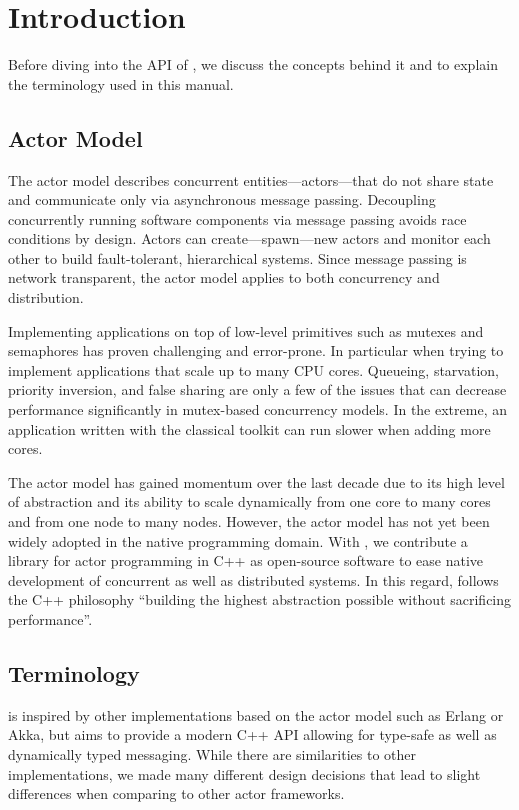 \section{Introduction}

Before diving into the API of \lib, we discuss the concepts behind it and to explain the terminology used in this manual.

\subsection{Actor Model}

The actor model describes concurrent entities---actors---that do not share state and communicate only via asynchronous message passing.
Decoupling concurrently running software components via message passing avoids race conditions by design.
Actors can create---spawn---new actors and monitor each other to build fault-tolerant, hierarchical systems.
Since message passing is network transparent, the actor model applies to both concurrency and distribution.

Implementing applications on top of low-level primitives such as mutexes and semaphores has proven challenging and error-prone.
In particular when trying to implement applications that scale up to many CPU cores.
Queueing, starvation, priority inversion, and false sharing are only a few of the issues that can decrease performance significantly in mutex-based concurrency models.
In the extreme, an application written with the classical toolkit can run slower when adding more cores.

The actor model has gained momentum over the last decade due to its high level of abstraction and its ability to scale dynamically from one core to many cores and from one node to many nodes.
However, the actor model has not yet been widely adopted in the native programming domain.
With \lib, we contribute a library for actor programming in C++ as open-source software to ease native development of concurrent as well as distributed systems.
In this regard, \lib follows the C++ philosophy ``building the highest abstraction possible without sacrificing performance''.

\subsection{Terminology}

\lib is inspired by other implementations based on the actor model such as Erlang or Akka, but aims to provide a modern C++ API allowing for type-safe as well as dynamically typed messaging.
While there are similarities to other implementations, we made many different design decisions that lead to slight differences when comparing \lib to other actor frameworks.

